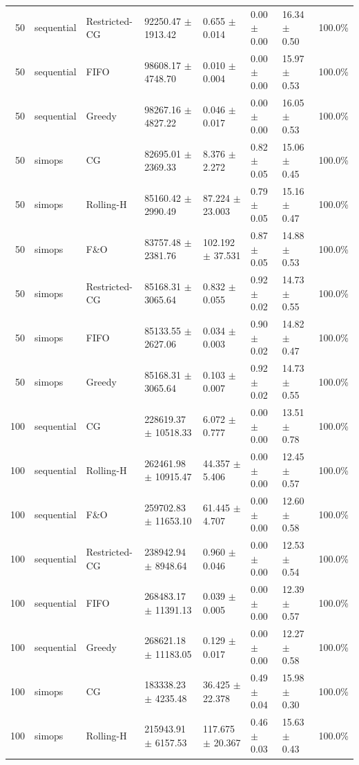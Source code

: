 \begin{tabular}{rlllllll}
50 & sequential & Restricted-CG & 92250.47 $\pm$ 1913.42 & 0.655 $\pm$ 0.014 & 0.00 $\pm$ 0.00 & 16.34 $\pm$ 0.50 & 100.0\% \\
50 & sequential & FIFO & 98608.17 $\pm$ 4748.70 & 0.010 $\pm$ 0.004 & 0.00 $\pm$ 0.00 & 15.97 $\pm$ 0.53 & 100.0\% \\
50 & sequential & Greedy & 98267.16 $\pm$ 4827.22 & 0.046 $\pm$ 0.017 & 0.00 $\pm$ 0.00 & 16.05 $\pm$ 0.53 & 100.0\% \\
50 & simops & CG & 82695.01 $\pm$ 2369.33 & 8.376 $\pm$ 2.272 & 0.82 $\pm$ 0.05 & 15.06 $\pm$ 0.45 & 100.0\% \\
50 & simops & Rolling-H & 85160.42 $\pm$ 2990.49 & 87.224 $\pm$ 23.003 & 0.79 $\pm$ 0.05 & 15.16 $\pm$ 0.47 & 100.0\% \\
50 & simops & F\&O & 83757.48 $\pm$ 2381.76 & 102.192 $\pm$ 37.531 & 0.87 $\pm$ 0.05 & 14.88 $\pm$ 0.53 & 100.0\% \\
50 & simops & Restricted-CG & 85168.31 $\pm$ 3065.64 & 0.832 $\pm$ 0.055 & 0.92 $\pm$ 0.02 & 14.73 $\pm$ 0.55 & 100.0\% \\
50 & simops & FIFO & 85133.55 $\pm$ 2627.06 & 0.034 $\pm$ 0.003 & 0.90 $\pm$ 0.02 & 14.82 $\pm$ 0.47 & 100.0\% \\
50 & simops & Greedy & 85168.31 $\pm$ 3065.64 & 0.103 $\pm$ 0.007 & 0.92 $\pm$ 0.02 & 14.73 $\pm$ 0.55 & 100.0\% \\
100 & sequential & CG & 228619.37 $\pm$ 10518.33 & 6.072 $\pm$ 0.777 & 0.00 $\pm$ 0.00 & 13.51 $\pm$ 0.78 & 100.0\% \\
100 & sequential & Rolling-H & 262461.98 $\pm$ 10915.47 & 44.357 $\pm$ 5.406 & 0.00 $\pm$ 0.00 & 12.45 $\pm$ 0.57 & 100.0\% \\
100 & sequential & F\&O & 259702.83 $\pm$ 11653.10 & 61.445 $\pm$ 4.707 & 0.00 $\pm$ 0.00 & 12.60 $\pm$ 0.58 & 100.0\% \\
100 & sequential & Restricted-CG & 238942.94 $\pm$ 8948.64 & 0.960 $\pm$ 0.046 & 0.00 $\pm$ 0.00 & 12.53 $\pm$ 0.54 & 100.0\% \\
100 & sequential & FIFO & 268483.17 $\pm$ 11391.13 & 0.039 $\pm$ 0.005 & 0.00 $\pm$ 0.00 & 12.39 $\pm$ 0.57 & 100.0\% \\
100 & sequential & Greedy & 268621.18 $\pm$ 11183.05 & 0.129 $\pm$ 0.017 & 0.00 $\pm$ 0.00 & 12.27 $\pm$ 0.58 & 100.0\% \\
100 & simops & CG & 183338.23 $\pm$ 4235.48 & 36.425 $\pm$ 22.378 & 0.49 $\pm$ 0.04 & 15.98 $\pm$ 0.30 & 100.0\% \\
100 & simops & Rolling-H & 215943.91 $\pm$ 6157.53 & 117.675 $\pm$ 20.367 & 0.46 $\pm$ 0.03 & 15.63 $\pm$ 0.43 & 100.0\% \\

\end{tabular}
